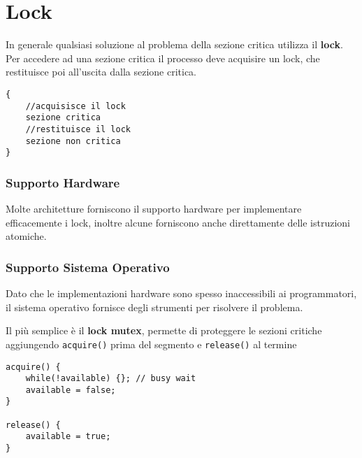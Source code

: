 \section{Lock}
In generale qualsiasi soluzione al problema della sezione critica utilizza il \textbf{lock}. Per accedere ad una sezione critica il processo deve acquisire un lock, che restituisce poi all'uscita dalla sezione critica.

\begin{verbatim}
{
    //acquisisce il lock
    sezione critica
    //restituisce il lock
    sezione non critica
}
\end{verbatim}

\subsubsection*{Supporto Hardware}
Molte architetture forniscono il supporto hardware per implementare efficacemente i lock, inoltre alcune forniscono anche direttamente delle istruzioni atomiche.

\subsubsection*{Supporto Sistema Operativo}
Dato che le implementazioni hardware sono spesso inaccessibili ai programmatori, il sistema operativo fornisce degli strumenti per risolvere il problema.

Il più semplice è il \textbf{lock mutex}, permette di proteggere le sezioni critiche aggiungendo \texttt{acquire()} prima del segmento e \texttt{release()} al termine
\begin{verbatim}
acquire() {
    while(!available) {}; // busy wait
    available = false;
}

release() {
    available = true;
}
\end{verbatim}
